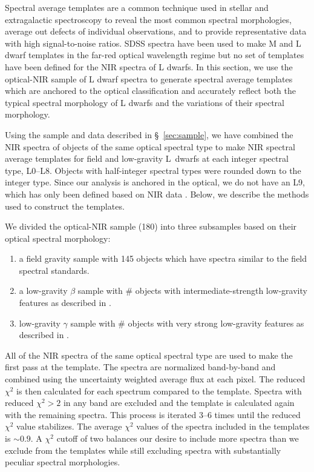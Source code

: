 \documentclass[12pt,preprint]{aastex}
\begin{document}
Spectral average templates are a common technique used in stellar and extragalactic spectroscopy to reveal the most common spectral morphologies, average out defects of individual observations, and to provide representative data with high signal-to-noise ratios.
SDSS spectra have been used to make M and L dwarf templates in the far-red optical wavelength regime \citep{Bochanski07_templates, Schmidt:2014jc} but no set of templates have been defined for the NIR spectra of L dwarfs.
In this section, we use the optical-NIR sample of L dwarf spectra to generate spectral average templates which are anchored to the optical classification and accurately reflect both the typical spectral morphology of L dwarfs and the variations of their spectral morphology.

Using the sample and data described in \S~\ref{sec:sample}, we have combined the NIR spectra of objects of the same optical spectral type to make NIR spectral average templates for field and low-gravity L~dwarfs at each integer spectral type, L0--L8. Objects with half-integer spectral types were rounded down to the integer type. 
Since our analysis is anchored in the optical, we do not have an L9, which has only been defined based on NIR data \citep{K99,Geballe02}.
Below, we describe the methods used to construct the templates.

We divided the optical-NIR sample (180) into three subsamples based on their optical spectral morphology: 
\begin{enumerate} \itemsep1pt \parskip0pt 
	\item a field gravity sample with 145 objects which have spectra similar to the \citet{K99} field spectral standards.
	\item a low-gravity $\beta$ sample with \# objects with intermediate-strength low-gravity features as described in \citet{Cruz09_lowg}.
	\item low-gravity $\gamma$ sample with \# objects with very strong low-gravity features as described in \citet{Cruz09_lowg}.
\end{enumerate}

All of the NIR spectra of the same optical spectral type are used to make the first pass at the template.
The spectra are normalized band-by-band and combined using the uncertainty weighted average flux at each pixel.
The reduced $\chi^2$ is then calculated for each spectrum compared to the template.
Spectra with reduced $\chi^2 > 2$ in any band are excluded and the template is calculated again with the remaining spectra.
This process is iterated 3--6 times until the reduced $\chi^2$ value stabilizes.
The average $\chi^2$ values of the spectra included in the templates is $\sim0.9$.
A $\chi^2$ cutoff of two balances our desire to include more spectra than we exclude from the templates while still excluding spectra with substantially peculiar spectral morphologies.
\end{document}
